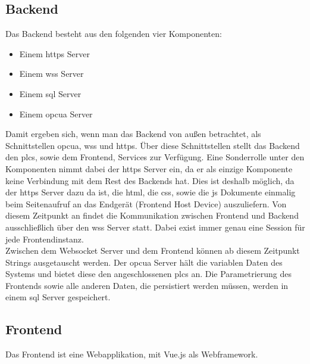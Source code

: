 \subsection{Backend}\label{subsec:archBackend}
Das Backend besteht aus den folgenden vier Komponenten:
 \begin{itemize}
  \item Einem \ac{https} Server
  \item Einem \ac{wss} Server 
  \item Einem \ac{sql} Server
  \item Einem \ac{opcua} Server 
\end{itemize}
Damit ergeben sich, wenn man das Backend von außen betrachtet, als Schnittstellen \ac{opcua}, \ac{wss} und \ac{https}.
Über diese Schnittstellen stellt das Backend den \acp{plc}, sowie dem Frontend, Services zur Verfügung.
Eine Sonderrolle unter den Komponenten nimmt dabei der \ac{https} Server ein, 
da er als einzige Komponente keine Verbindung mit dem Rest des Backends hat.
Dies ist deshalb möglich, da der \ac{https} Server dazu da ist, die \ac{html}, die \ac{css}, sowie die \ac{js} Dokumente 
einmalig beim Seitenaufruf an das Endgerät (Frontend Host Device) auszuliefern.
Von diesem Zeitpunkt an findet die Kommunikation zwischen Frontend und Backend ausschließlich über den \ac{wss} Server statt.
Dabei exist immer genau eine Session für jede Frontendinstanz. 
\\Zwischen dem Websocket Server und dem Frontend können ab diesem Zeitpunkt Strings ausgetauscht werden.
Der \ac{opcua} Server hält die variablen Daten des Systems und bietet diese den angeschlossenen \acp{plc} an.
Die Parametrierung des Frontends sowie alle anderen Daten, die persistiert werden müssen, 
werden in einem \ac{sql} Server gespeichert.

\subsection{Frontend}\label{subsec:archFrontend}
Das Frontend ist eine Webapplikation, mit Vue.js \citep{vue} als Webframework.%


